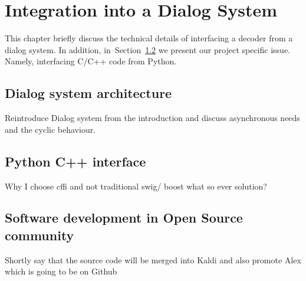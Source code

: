 \chapter{Integration into a Dialog System}
\label{cha:integration_into_dialog_system}
This chapter briefly discuss the technical details of interfacing
a decoder from a dialog system.
In addition, in~Section~\ref{sec:python_c_interface} we present our project specific issue.
Namely, interfacing C/C++ code from Python.

\section{Dialog system architecture} 
\label{sec:dialog_system_architecture}
Reintroduce Dialog system from the introduction and discuss asynchronous needs
and the cyclic behaviour.



\section{Python C++ interface} 
\label{sec:python_c_interface}
Why I choose cffi and not traditional swig/ boost what so ever solution?


\section{Software development in Open Source community} 
\label{sec:software_development_in_open_source_community}
Shortly say that the source code will be merged into Kaldi 
and also promote Alex which is going to be on Github




